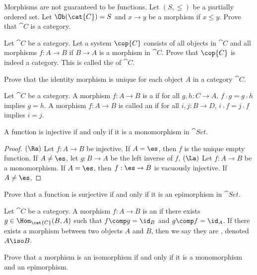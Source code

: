 \documentclass[10pt]{article}
\begin{document}
\begin{problem}
    Morphisms are not guaranteed to be functions. Let $(S,\le)$ be a partially ordered set. Let $\Ob(\cat{C})=S$ and $x\to y$ be a morphism if $x\le y$. Prove that $\cat{C}$ is a category.
\end{problem}
\begin{problem}
    Let $\cat{C}$ be a category. Let a system $\cop{C}$ consists of all objects in $\cat{C}$ and all morphisms $f:A\to B$ if $B\to A$ is a morphism in $\cat{C}$. Prove that $\cop{C}$ is indeed a category. This is called the  of $\cat{C}$.
\end{problem}
\begin{problem}
    Prove that the identity morphism is unique for each object $A$ in a category $\cat{C}$.
\end{problem}
\begin{definition}
    Let $\cat{C}$ be a category. A morphism $f:A\to B$ is a  if for all $g,h:C\to A$, $f\comp g=g\comp h$ implies $g=h$. A morphism $f:A\to B$ is called an  if for all $i,j:B\to D$, $i\comp f=j\comp f$ implies $i=j$.
\end{definition}
\begin{proposition}
    A function is injective if and only if it is a monomorphism in $\cat{Set}$.
\end{proposition}
\begin{proof}
    $(\Ra)$ Let $f:A\to B$ be injective. If $A=\es$, then $f$ is the unique empty function. If $A\ne\es$, let $g:B\to A$ be the left inverse of $f$, 
    $(\La)$ Let $f:A\to B$ be a monomorphism. If $A=\es$, then $f:\es\to B$ is vacuously injective. If $A\ne\es$, 
\end{proof}
\begin{problem}
    Prove that a function is surjective if and only if it is an epimorphism in $\cat{Set}$.
\end{problem}
\begin{definition}
    Let $\cat{C}$ be a category. A morphism $f:A\to B$ is an  if there exists $g\in{\Hom}_{\cat{C}}(B,A)$ such that $f\comp g={\id}_{B}$ and $g\comp f={\id}_{A}$. If there exists a morphism between two objects $A$ and $B$, then we say they are , denoted $A\iso B$.
\end{definition}
\begin{problem}
    Prove that a morphism is an isomorphism if and only if it is a monomorphism and an epimorphism.
\end{problem}
\end{document}
